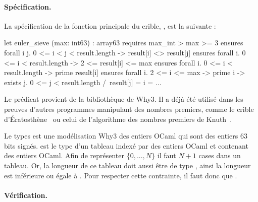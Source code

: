 \documentclass[a4paper]{easychair}
\begin{document}
\paragraph{Spécification.}
La spécification de la fonction principale du crible,
, est la suivante :

\begin{why3}
let euler_sieve (max: int63) : array63
  requires { max_int > max >= 3 }
  ensures  { forall i j. 0 <= i < j < result.length -> result[i] <> result[j] }
  ensures  { forall i. 0 <= i < result.length -> 2 <= result[i] <= max }
  ensures  { forall i. 0 <= i < result.length -> prime result[i] }
  ensures  { forall i. 2 <= i <= max -> prime i ->
                       exists j. 0 <= j < result.length /\ result[j] = i }
= ...
\end{why3}


Le prédicat  provient de la bibliothèque 
de Why3. Il a déjà été utilisé dans les preuves d'autres programmes
manipulant des nombres premiers, comme le crible
d'Ératosthène~\cite{sieve-eratosthene-why3} ou celui de l'algorithme
des nombres premiers de Knuth~\cite{knuth-prime-numbers,knuth-prime-numbers-why3}.


Le types  est une modélisation Why3 des entiers OCaml qui sont
des entiers 63 bits signés.  est le type d'un tableau indexé
par des entiers OCaml et contenant des entiers OCaml.
Afin de représenter $\{0,...,N\}$ il faut $N + 1$ cases dans un tableau.
Or, la longueur de ce tableau doit aussi être de type , ainsi
la longueur est inférieure ou égale à . Pour respecter
cette contrainte, il faut donc que .



\paragraph{Vérification.}
\end{document}
